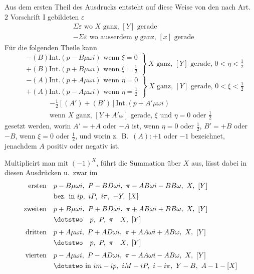 Aus dem ersten Theil des Ausdrucks entsteht auf diese Weise von den nach Art.\ $2$ Vorschrift I gebildeten $\varepsilon$
\[
\begin{aligned}
&\Sigma\varepsilon\text{ wo }X\text{ ganz, }[Y]\text{ gerade}\\
&-\Sigma\varepsilon\text{ wo ausserdem }y\text{ ganz, }[x]\text{ gerade}
\end{aligned}
\]
Für die folgenden Theile kann
\[
\left.\begin{aligned}
&-(B)\mathrm{Int.}(p-B\mu\omega i)\text{ wenn }\xi=0\\
&+(B)\mathrm{Int.}(p+B\mu\omega i)\text{ wenn }\xi=\tfrac12
\end{aligned}\right\}\ X\text{ ganz, }[Y]\text{ gerade, }0<\eta<\tfrac12
\]
\[
\left.\begin{aligned}
&-(A)\mathrm{Int.}(p+A\mu\omega i)\text{ wenn }\eta=0\\
&+(A)\mathrm{Int.}(p-A\mu\omega i)\text{ wenn }\eta=\tfrac12
\end{aligned}\right\}\ X\text{ ganz, }[Y]\text{ gerade, }0<\xi<\tfrac12
\]
\[
\begin{gathered}
-\tfrac12[(A')+(B')]\mathrm{Int.}(p+A'\mu\omega i)\\
\text{wenn }X\text{ ganz, }[Y+A'\omega]\text{ gerade, }\xi\text{ und }\eta=0\text{ oder }\tfrac12
\end{gathered}
\]
gesetzt werden, worin $A'=+A$ oder $-A$ ist, wenn $\eta=0$ oder $\tfrac12$, $B'=+B$ oder $-B$, wenn $\xi=0$ oder $\tfrac12$, und worin z.\ B.\ $(A):+1$ oder $-1$ bezeichnet, jenachdem $A$ positiv oder negativ ist.

Multiplicirt man mit $(-1)^X$, führt die Summation über $X$ aus, lässt dabei in diesen Ausdrücken u.\ zwar im
\[
\begin{aligned}
\text{ersten}\quad&p-B\mu\omega i,\ P-BD\omega i,\ \pi-AB\omega i-BB\omega,\ X,\ [Y]\\
&\text{bez. in }ip,\ iP,\ i\pi,\ -Y,\ [X]\\[3pt]
\text{zweiten}\quad&p+B\mu\omega i,\ P+BD\omega i,\ \pi+AB\omega i+BB\omega,\ X,\ [Y]\\
&\dotstwo\quad p,\ P,\ \pi\quad X,\ [Y]\\[3pt]
\text{dritten}\quad&p+A\mu\omega i,\ P+AD\omega i,\ \pi+AA\omega i+AB\omega,\ X,\ [Y]\\
&\dotstwo\quad p,\ P,\ \pi\quad X,\ [Y]\\[3pt]
\text{vierten}\quad&p-A\mu\omega i,\ P-AD\omega i,\ \pi-AA\omega i-AB\omega,\ X,\ [Y]\\
&\dotstwo\text{ in }im-ip,\ iM-iP,\ i-i\pi,\ Y-B,\ A-1-[X]
\end{aligned}
\]


